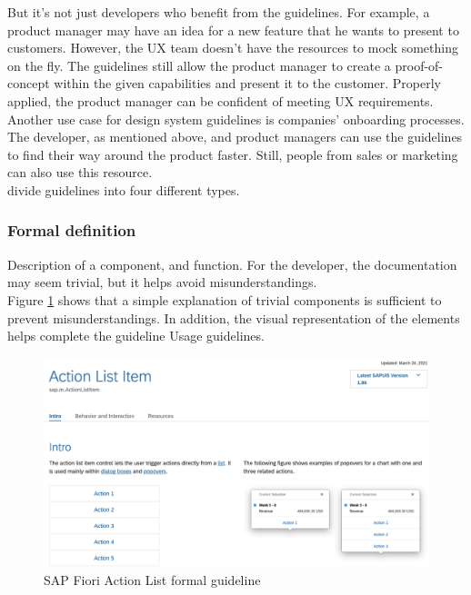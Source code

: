 But it's not just developers who benefit from the guidelines. For example, a product manager may have an idea for a new feature that he wants to present to customers. However, the \ac{UX} team doesn't have the resources to mock something on the fly. The guidelines still allow the product manager to create a proof-of-concept within the given capabilities and present it to the customer. Properly applied, the product manager can be confident of meeting \ac{UX} requirements.  \cite{vesselov_building_2019} \\
Another use case for design system guidelines is companies' onboarding processes. The developer, as mentioned above, and product managers can use the guidelines to find their way around the product faster. Still, people from sales or marketing can also use this resource. \cite{vesselov_building_2019} \\

\citet*{vesselov_building_2019} divide guidelines into four different types.

\subsubsection{Formal definition} 
Description of a component, and function. For the developer, the documentation may seem trivial, but it helps avoid misunderstandings. \cite{vesselov_building_2019}  \\
Figure \ref{fiori_action_list} shows that a simple explanation of trivial components is sufficient to prevent misunderstandings. In addition, the visual representation of the elements helps complete the guideline Usage guidelines.
\begin{figure}[ht]
\centerline{\includegraphics[width=\linewidth]{images/fiori_action-list_formal.png}}
\caption{SAP Fiori Action List formal guideline \cite{sap_fiori_nodate}}
\label{fiori_action_list}
\end{figure}
\newpage

